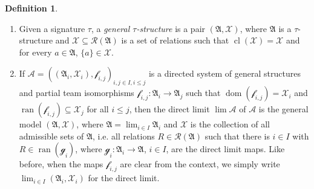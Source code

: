 \documentclass[a4paper]{amsart}
\theoremstyle{definition}
\newtheorem{definition}{Definition}[section]
\theoremstyle{remark}
\newcommand{\A}{\mathcal{A}}
\DeclareMathOperator{\dom}{dom}
\DeclareMathOperator{\ran}{ran}
\newcommand{\R}{\mathcal{R}}
\newcommand{\X}{\mathcal{X}}
\theoremstyle{definition}
\renewcommand{\A}{\mathfrak{A}}
\newcommand{\f}{\mathcal{f}}
\newcommand{\g}{\mathcal{g}}
\DeclareMathOperator{\cl}{cl}
\begin{document}
\begin{definition}\quad
    \begin{enumerate}
        \item Given a signature $\tau$, a \emph{general $\tau$-structure} is a pair $(\A,\X)$, where $\A$ is a $\tau$-structure and $\X\subseteq\R(\A)$ is a set of relations such that $\cl(\X) = \X$ and for every $a\in \A$, $\{a\}\in \X$.

        \item If $\mathcal A = ((\A_i,\X_i),\f_{i,j})_{i,j\in I, i\leq j}$ is a directed system of general structures and partial team isomorphisms $\f_{i,j}\colon\A_i\to\A_j$ such that $\dom(\f_{i,j}) = \X_i$ and $\ran(\f_{i,j})\subseteq\X_j$ for all $i\leq j$, then the direct limit $\lim\mathcal A$ of $\mathcal A$ is the general model $(\A,\X)$, where $\A = \lim_{i\in I}\A_i$ and $\X$ is the collection of all admissible sets of $\A$, i.e. all relations $R\in\R(\A)$ such that there is $i\in I$ with $R\in\ran(\g_i)$, where $\g_i\colon\A_i\to\A$, $i\in I$, are the direct limit maps. Like before, when the maps $\f_{i,j}$ are clear from the context, we simply write $\lim_{i\in I}(\A_i,\X_i)$ for the direct limit.


\end{enumerate}
\end{definition}
\end{document}
